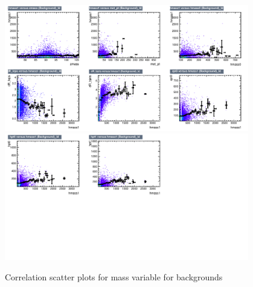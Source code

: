 \begin{figure}[!htb]%
\centering
\includegraphics[width=0.95\textwidth]{figures/CRDY/dataset/plots/correlationscatter_hmass1__Id_c3.pdf}
\includegraphics[width=0.95\textwidth]{figures/CRDY/dataset/plots/correlationscatter_hmass1__Id_c4.pdf}
\caption{ Correlation scatter plots for \HBB mass variable for backgrounds}%
\label{fig:correlations_CRDY_hmass1_BG}                                                       
\end{figure}
 


